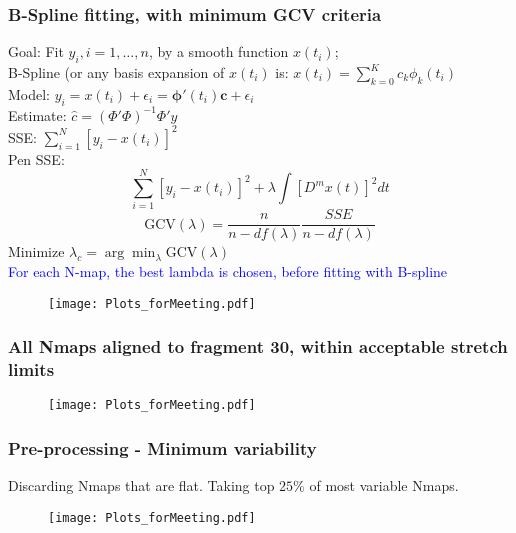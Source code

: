 \documentclass[10pt,dvipsnames,table]{beamer}
\begin{document}
\begin{frame}
\frametitle{B-Spline fitting, with minimum GCV criteria}
Goal: Fit $y_i, i = 1, \dots, n$, by a smooth function $x(t_i)$; \\
B-Spline (or any basis expansion of $x(t_i)$ is: $x(t_i) = \sum\limits_{k = 0}^K c_k \phi_k(t_i)$\\
Model: $y_i = x(t_i) + \epsilon _i = \mathbf{\phi'}(t_i)\mathbf{c} + \epsilon _i$ \\
Estimate: $\hat{c} = (\Phi'\Phi)^{-1}\Phi' y$ \\
SSE: $\sum \limits_{i = 1}^N [y_i - x(t_i)]^2$ \\
\pause 
Pen SSE: $$\sum \limits_{i = 1}^N [y_i - x(t_i)]^2 + \lambda \int[D^mx(t)]^2dt$$
$$ \text{GCV}(\lambda) = \frac{n}{n - df(\lambda)}\frac{SSE}{n - df(\lambda)}$$
Minimize $\lambda_c = \arg \min _{\lambda} \text{GCV}(\lambda)$ \\
\textcolor{blue}{For each N-map, the best lambda is chosen, before fitting with B-spline}
\end{frame}

\begin{frame}
\begin{figure}
\texttt{[image: Plots\_forMeeting.pdf]}
\end{figure}
\end{frame}

\begin{frame}
\frametitle{All Nmaps aligned to fragment 30, within acceptable stretch limits}
\begin{figure}
\texttt{[image: Plots\_forMeeting.pdf]}
\end{figure}
\end{frame}

\begin{frame}
\frametitle{Pre-processing - Minimum variability}
Discarding Nmaps that are flat. Taking top $25\%$ of most variable Nmaps.
\begin{figure}
\texttt{[image: Plots\_forMeeting.pdf]}
\end{figure}
\end{frame}
\end{document}
